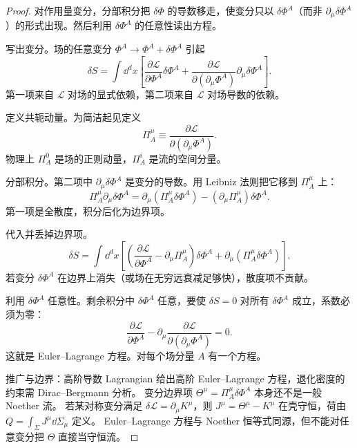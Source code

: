 \begin{proof}
对作用量变分，分部积分把 $\delta\Phi$ 的导数移走，使变分只以 $\delta\Phi^A$（而非 $\partial_\mu\delta\Phi^A$）的形式出现。然后利用 $\delta\Phi^A$ 的任意性读出方程。

写出变分。场的任意变分 $\Phi^A\to\Phi^A+\delta\Phi^A$ 引起
\begin{equation*}
\delta S=\int \dd^dx\left[\frac{\partial\mathcal{L}}{\partial\Phi^A}\delta\Phi^A+\frac{\partial\mathcal{L}}{\partial(\partial_\mu\Phi^A)}\partial_\mu\delta\Phi^A\right].
\end{equation*}
第一项来自 $\mathcal{L}$ 对场的显式依赖，第二项来自 $\mathcal{L}$ 对场导数的依赖。

定义共轭动量。为简洁起见定义
\begin{equation*}
\Pi_A^\mu\equiv\frac{\partial\mathcal{L}}{\partial(\partial_\mu\Phi^A)}.
\end{equation*}
物理上 $\Pi_A^0$ 是场的正则动量，$\Pi_A^i$ 是流的空间分量。

分部积分。第二项中 $\partial_\mu\delta\Phi^A$ 是变分的导数。用 Leibniz 法则把它移到 $\Pi_A^\mu$ 上：
\begin{equation*}
\Pi_A^\mu\partial_\mu\delta\Phi^A=\partial_\mu(\Pi_A^\mu\delta\Phi^A)-(\partial_\mu\Pi_A^\mu)\delta\Phi^A.
\end{equation*}
第一项是全散度，积分后化为边界项。

代入并丢掉边界项。
\begin{equation*}
\delta S=\int \dd^dx\left[\left(\frac{\partial\mathcal{L}}{\partial\Phi^A}-\partial_\mu\Pi_A^\mu\right)\delta\Phi^A+\partial_\mu(\Pi_A^\mu\delta\Phi^A)\right].
\end{equation*}
若变分 $\delta\Phi^A$ 在边界上消失（或场在无穷远衰减足够快），散度项不贡献。

利用 $\delta\Phi^A$ 任意性。剩余积分中 $\delta\Phi^A$ 任意，要使 $\delta S=0$ 对所有 $\delta\Phi^A$ 成立，系数必须为零：
\begin{equation}\label{eq:ms-poincare-EL}
{
\frac{\partial\mathcal{L}}{\partial\Phi^A}-\partial_\mu\frac{\partial\mathcal{L}}{\partial(\partial_\mu\Phi^A)}=0.
}
\end{equation}
这就是 Euler--Lagrange 方程。对每个场分量 $A$ 有一个方程。

推广与边界：高阶导数 Lagrangian 给出高阶 Euler--Lagrange 方程，退化密度的约束需 Dirac--Bergmann 分析。
变分边界项 $\Theta^\mu=\Pi_A^\mu\delta\Phi^A$ 本身还不是一般 Noether 流。
若某对称变分满足 $\delta\mathcal L=\partial_\mu K^\mu$，则
$J^\mu=\Theta^\mu-K^\mu$ 在壳守恒，荷由 $Q=\int_\Sigma J^\mu\dd\Sigma_\mu$ 定义。
Euler--Lagrange 方程与 Noether 恒等式同源，但不能对任意变分把 $\Theta$ 直接当守恒流。
\end{proof}

